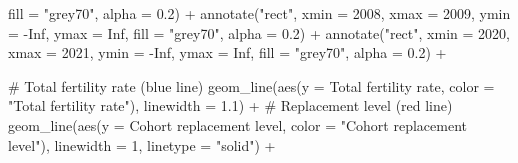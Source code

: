 \documentclass[
  letterpaper,
  DIV=11,
  numbers=noendperiod]{scrartcl}
\newenvironment{Shaded}{\begin{snugshade}}{\end{snugshade}}
\newcommand{\AttributeTok}[1]{\textcolor[rgb]{0.40,0.45,0.13}{#1}}
\newcommand{\CommentTok}[1]{\textcolor[rgb]{0.37,0.37,0.37}{#1}}
\newcommand{\ConstantTok}[1]{\textcolor[rgb]{0.56,0.35,0.01}{#1}}
\newcommand{\DecValTok}[1]{\textcolor[rgb]{0.68,0.00,0.00}{#1}}
\newcommand{\FloatTok}[1]{\textcolor[rgb]{0.68,0.00,0.00}{#1}}
\newcommand{\FunctionTok}[1]{\textcolor[rgb]{0.28,0.35,0.67}{#1}}
\newcommand{\NormalTok}[1]{\textcolor[rgb]{0.00,0.23,0.31}{#1}}
\newcommand{\SpecialCharTok}[1]{\textcolor[rgb]{0.37,0.37,0.37}{#1}}
\newcommand{\StringTok}[1]{\textcolor[rgb]{0.13,0.47,0.30}{#1}}
\begin{document}
\begin{Shaded}
\begin{Highlighting}[]
           \AttributeTok{fill =} \StringTok{"grey70"}\NormalTok{, }\AttributeTok{alpha =} \FloatTok{0.2}\NormalTok{) }\SpecialCharTok{+}
  \FunctionTok{annotate}\NormalTok{(}\StringTok{"rect"}\NormalTok{, }\AttributeTok{xmin =} \DecValTok{2008}\NormalTok{, }\AttributeTok{xmax =} \DecValTok{2009}\NormalTok{, }\AttributeTok{ymin =} \SpecialCharTok{{-}}\ConstantTok{Inf}\NormalTok{, }\AttributeTok{ymax =} \ConstantTok{Inf}\NormalTok{,}
           \AttributeTok{fill =} \StringTok{"grey70"}\NormalTok{, }\AttributeTok{alpha =} \FloatTok{0.2}\NormalTok{) }\SpecialCharTok{+}
  \FunctionTok{annotate}\NormalTok{(}\StringTok{"rect"}\NormalTok{, }\AttributeTok{xmin =} \DecValTok{2020}\NormalTok{, }\AttributeTok{xmax =} \DecValTok{2021}\NormalTok{, }\AttributeTok{ymin =} \SpecialCharTok{{-}}\ConstantTok{Inf}\NormalTok{, }\AttributeTok{ymax =} \ConstantTok{Inf}\NormalTok{,}
           \AttributeTok{fill =} \StringTok{"grey70"}\NormalTok{, }\AttributeTok{alpha =} \FloatTok{0.2}\NormalTok{) }\SpecialCharTok{+}

  \CommentTok{\# Total fertility rate (blue line)}
  \FunctionTok{geom\_line}\NormalTok{(}\FunctionTok{aes}\NormalTok{(}\AttributeTok{y =} \StringTok{\textasciigrave{}}\AttributeTok{Total fertility rate}\StringTok{\textasciigrave{}}\NormalTok{, }\AttributeTok{color =} \StringTok{"Total fertility rate"}\NormalTok{), }\AttributeTok{linewidth =} \FloatTok{1.1}\NormalTok{) }\SpecialCharTok{+}
  \CommentTok{\# Replacement level (red line)}
  \FunctionTok{geom\_line}\NormalTok{(}\FunctionTok{aes}\NormalTok{(}\AttributeTok{y =} \StringTok{\textasciigrave{}}\AttributeTok{Cohort replacement level}\StringTok{\textasciigrave{}}\NormalTok{, }\AttributeTok{color =} \StringTok{"Cohort replacement level"}\NormalTok{),}
            \AttributeTok{linewidth =} \DecValTok{1}\NormalTok{, }\AttributeTok{linetype =} \StringTok{"solid"}\NormalTok{) }\SpecialCharTok{+}


\end{Highlighting}
\end{Shaded}
\end{document}
